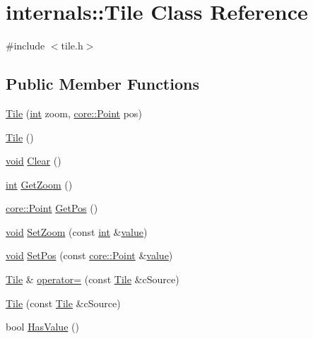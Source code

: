 \hypertarget{classinternals_1_1_tile}{\section{internals\-:\-:Tile Class Reference}
\label{classinternals_1_1_tile}
}


{\ttfamily \#include $<$tile.\-h$>$}

\subsection*{Public Member Functions}
\begin{DoxyCompactItemize}
\item 
\hyperlink{group___o_p_map_widget_ga60a32de8eb056679d219587b8caf1237}{Tile} (\hyperlink{ioapi_8h_a787fa3cf048117ba7123753c1e74fcd6}{int} zoom, \hyperlink{structcore_1_1_point}{core\-::\-Point} pos)
\item 
\hyperlink{group___o_p_map_widget_ga0dbddb1e894ab49cd9965e12002f3969}{Tile} ()
\item 
\hyperlink{group___u_a_v_objects_plugin_ga444cf2ff3f0ecbe028adce838d373f5c}{void} \hyperlink{group___o_p_map_widget_ga827a2b95ce33f4a2dcbb98cd1b94ea65}{Clear} ()
\item 
\hyperlink{ioapi_8h_a787fa3cf048117ba7123753c1e74fcd6}{int} \hyperlink{group___o_p_map_widget_ga8f3669a9492cdfacd22026ef7456735d}{Get\-Zoom} ()
\item 
\hyperlink{structcore_1_1_point}{core\-::\-Point} \hyperlink{group___o_p_map_widget_gacdfd78f26efd7d893ba5329145465096}{Get\-Pos} ()
\item 
\hyperlink{group___u_a_v_objects_plugin_ga444cf2ff3f0ecbe028adce838d373f5c}{void} \hyperlink{group___o_p_map_widget_gada2e44d9a3bcfa1e07e8220944335692}{Set\-Zoom} (const \hyperlink{ioapi_8h_a787fa3cf048117ba7123753c1e74fcd6}{int} \&\hyperlink{glext_8h_aa0e2e9cea7f208d28acda0480144beb0}{value})
\item 
\hyperlink{group___u_a_v_objects_plugin_ga444cf2ff3f0ecbe028adce838d373f5c}{void} \hyperlink{group___o_p_map_widget_gabc58fab03485a97b6d6dbb4982ebf677}{Set\-Pos} (const \hyperlink{structcore_1_1_point}{core\-::\-Point} \&\hyperlink{glext_8h_aa0e2e9cea7f208d28acda0480144beb0}{value})
\item 
\hyperlink{classinternals_1_1_tile}{Tile} \& \hyperlink{group___o_p_map_widget_ga00b02eca9e95aed841be1192fbd16e74}{operator=} (const \hyperlink{classinternals_1_1_tile}{Tile} \&c\-Source)
\item 
\hyperlink{group___o_p_map_widget_ga18b470118154d71c8f34a805c8bcc782}{Tile} (const \hyperlink{classinternals_1_1_tile}{Tile} \&c\-Source)
\item 
bool \hyperlink{group___o_p_map_widget_ga1224388bdb3b16ffe20514aa23ef0687}{Has\-Value} ()
\end{DoxyCompactItemize}
